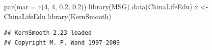 \documentclass[
  b5paper,
  UTF8,twoside]{book}
\newenvironment{Shaded}{\begin{snugshade}}{\end{snugshade}}
\newcommand{\AttributeTok}[1]{\textcolor[rgb]{0.77,0.63,0.00}{#1}}
\newcommand{\DecValTok}[1]{\textcolor[rgb]{0.00,0.00,0.81}{#1}}
\newcommand{\FloatTok}[1]{\textcolor[rgb]{0.00,0.00,0.81}{#1}}
\newcommand{\FunctionTok}[1]{\textcolor[rgb]{0.00,0.00,0.00}{#1}}
\newcommand{\NormalTok}[1]{#1}
\newcommand{\OtherTok}[1]{\textcolor[rgb]{0.56,0.35,0.01}{#1}}
\begin{document}
\begin{Shaded}
\begin{Highlighting}[]
\FunctionTok{par}\NormalTok{(}\AttributeTok{mar =} \FunctionTok{c}\NormalTok{(}\DecValTok{4}\NormalTok{, }\DecValTok{4}\NormalTok{, }\FloatTok{0.2}\NormalTok{, }\FloatTok{0.2}\NormalTok{))}
\FunctionTok{library}\NormalTok{(MSG)}
\FunctionTok{data}\NormalTok{(ChinaLifeEdu)}
\NormalTok{x }\OtherTok{\textless{}{-}}\NormalTok{ ChinaLifeEdu}
\FunctionTok{library}\NormalTok{(KernSmooth)}
\end{Highlighting}
\end{Shaded}

\begin{verbatim}
## KernSmooth 2.23 loaded
## Copyright M. P. Wand 1997-2009
\end{verbatim}
\end{document}
